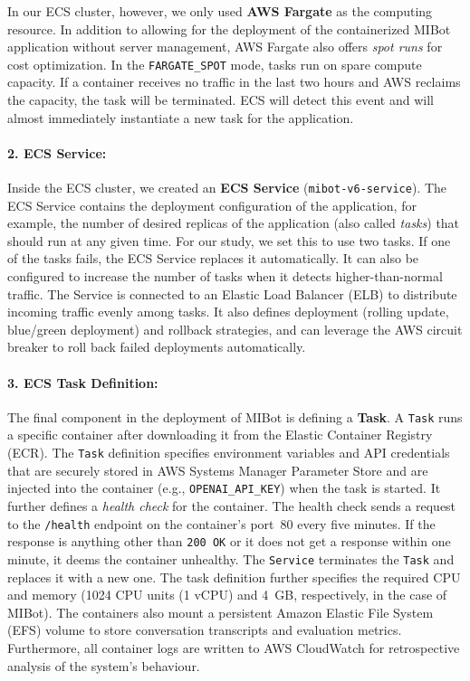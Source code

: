 In our ECS cluster, however, we only used \textbf{AWS Fargate} as the computing
resource. In addition to allowing for the deployment of the containerized MIBot
application without server management, AWS Fargate also offers \emph{spot runs} for
cost optimization. In the \texttt{FARGATE\_SPOT} mode, tasks run on spare compute
capacity. If a container receives no traffic in the last two hours and AWS reclaims the
capacity, the task will be terminated. ECS will detect this event and will almost
immediately instantiate a new task for the application.

\paragraph{2. ECS Service:}Inside the ECS cluster, we created an \textbf{ECS Service} (\texttt{mibot-v6-service}).
The ECS Service contains the deployment configuration of the application, for example,
the number of desired replicas of the application (also called \emph{tasks}) that
should run at any given time. For our study, we set this to use two tasks. If one of
the tasks fails, the ECS Service replaces it automatically. It can also be configured
to increase the number of tasks when it detects higher-than-normal traffic. The Service
is connected to an Elastic Load Balancer (ELB) to distribute incoming traffic evenly
among tasks. It also defines deployment (rolling update, blue/green deployment) and
rollback strategies, and can leverage the AWS circuit breaker to roll back failed
deployments automatically.

\paragraph{3. ECS Task Definition:}The final component in the deployment of MIBot is defining a \textbf{Task}. A
\texttt{Task} runs a specific container after downloading it from the Elastic Container
Registry (ECR). The \texttt{Task} definition specifies environment variables and API
credentials that are securely stored in AWS Systems Manager Parameter Store and are
injected into the container (e.g., \texttt{OPENAI\_API\_KEY}) when the task is started.
It further defines a \emph{health check} for the container. The health check sends a
request to the \texttt{/health} endpoint on the container's port~80 every five minutes.
If the response is anything other than \texttt{200 OK} or it does not get a response
within one minute, it deems the container unhealthy. The \texttt{Service} terminates
the \texttt{Task} and replaces it with a new one. The task definition further specifies
the required CPU and memory (1024 CPU units (1 vCPU) and 4~GB, respectively, in the
case of MIBot). The containers also mount a persistent Amazon Elastic File System (EFS)
volume to store conversation transcripts and evaluation metrics. Furthermore, all
container logs are written to AWS CloudWatch for retrospective analysis of the system's
behaviour.

